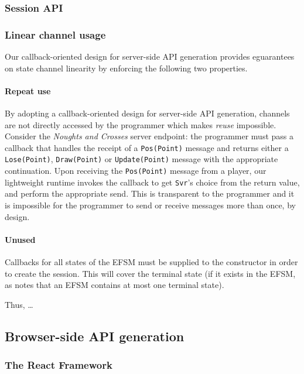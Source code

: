 \documentclass[submission,copyright,creativecommons]{eptcs}
\begin{document}
\subsubsection{Session API}
\label{section:serversessionapi}

\subsubsection{Linear channel usage}
\label{section:serverlinear}
Our callback-oriented design for server-side API generation provides eguarantees on state channel linearity by enforcing the following two properties.

\paragraph{Repeat use} By adopting a callback-oriented design for server-side API generation, channels are not directly accessed by the programmer which makes \textit{reuse} impossible. Consider the \textit{Noughts and Crosses} server endpoint: the programmer must pass a callback that handles the receipt of a \texttt{Pos(Point)} message and returns either a \texttt{Lose(Point)}, \texttt{Draw(Point)} or \texttt{Update(Point)} message with the appropriate continuation. Upon receiving the \texttt{Pos(Point)} message from a player, our lightweight runtime invokes the callback to get \texttt{Svr}'s choice from the return value, and perform the appropriate send. This is transparent to the programmer and it is impossible for the programmer to send or receive messages more than once, by design.

\paragraph{Unused} Callbacks for all states of the EFSM must be supplied to the constructor in order to create the session. This will cover the terminal state (if it exists in the EFSM, as \cite{Hybrid2016} notes that an EFSM contains at most one terminal state).

Thus, \dots



\subsection{Browser-side API generation}
\label{section:browser}

\subsubsection{The React Framework}
\end{document}
